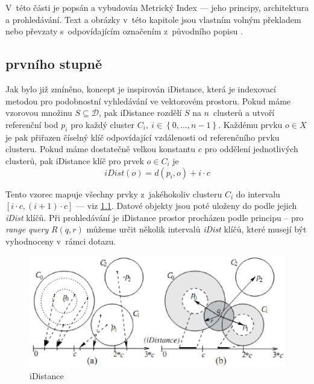 \chapter{\MIndex{}}

V~této části je popsán a vybudován Metrický Index --- jeho principy, architektura a prohledávání.
Text a obrázky v~této kapitole jsou vlastním volným překladem nebo převzaty s~odpovídajícím označením z~původního popisu \cite{Novak:2009:MIE:1637863.1638184}.

\section{\MIndex{} prvního stupně}

Jak bylo již zmíněno, koncept  je inspirován iDistance, která je indexovací metodou pro podobnostní vyhledávání ve vektorovém prostoru.
Pokud máme vzorovou množinu $S\subseteq\mathbb{\mathcal{D}}$, pak iDistance rozdělí $S$ na $n$~clusterů a utvoří referenční bod $p_{i}$ pro každý cluster $C_{i},\: i\in\left\{ 0,\ldots,n-1\right\} $.
Každému prvku $o\in X$ je pak přiřazen číselný klíč odpovídající vzdálenosti od referenčního prvku clusteru.
Pokud máme dostatečně velkou konstantu $c$ pro oddělení jednotlivých clusterů, pak iDistance klíč pro prvek
$o\in C_{i}$ je
\[
iDist(o)=d(p_{i},o)+i\cdot c
\]


Tento vzorec mapuje všechny prvky z~jakéhokoliv clusteru $C_{i}$ do intervalu $[i\cdot c,(i+1)\cdot c]$ --- viz \ref{fig:iDistance}.
Datové objekty jsou poté uloženy do \BPTree{} podle jejich \emph{iDist} klíčů.
Při prohledávání je iDistance prostor procházen podle principu -- pro \emph{range query} $R(q,r)$ můžeme určit několik intervalů
\emph{iDist} klíčů, které musejí být vyhodnoceny v~rámci dotazu.

\begin{figure}[t]
\center
\includegraphics[clip,scale=0.4]{idistance}

\caption{iDistance}
\label{fig:iDistance}
\end{figure}

